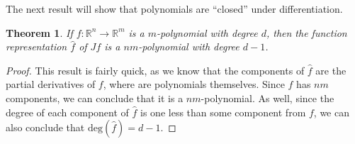 \documentclass{article}
\theoremstyle{plain} %
\newtheorem{thm}{Theorem}
\numberwithin{thm}{section} %
\theoremstyle{definition}
\begin{document}
    The next result will show that polynomials are ``closed'' under differentiation.
    \begin{thm}
        If \(f: \mathbb{R}^n \to \mathbb{R}^m\) is a \(m\)-polynomial with degree \(d\), then the function representation \(\hat{f}\) of \(Jf\) is a \(nm\)-polynomial with degree \(d - 1\).
    \end{thm}
    \begin{proof}
        This result is fairly quick, as we know that the components of \(\hat{f}\) are the partial derivatives of \(f\), where are polynomials themselves. Since \(\hat{f}\) has \(nm\) components, we can conclude that it is a \(nm\)-polynomial. As well, since the degree of each component of \(\hat{f}\) is one less than some component from \(f\), we can also conclude that \(\mathrm{deg} (\hat{f}) = d - 1\).
    \end{proof}
    
\end{document}

